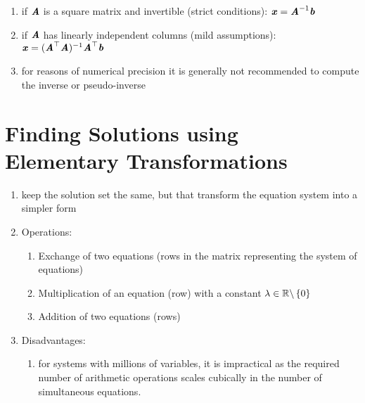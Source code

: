 \begin{enumerate}
    \item if $\text{\textbf{\textit{A}}}$ is a square matrix and invertible (strict conditions): $\text{\textbf{\textit{x}}} = \text{\textbf{\textit{A}}}^{-1}\text{\textbf{\textit{b}}}$
    \hfill \cite{mfml/book/mml/Deisenroth-Faisal-Ong}

    \item if $\text{\textbf{\textit{A}}}$ has linearly independent columns (mild assumptions): $\text{\textbf{\textit{x}}} = (\text{\textbf{\textit{A}}}^\top  \text{\textbf{\textit{A}}})^{-1}\text{\textbf{\textit{A}}}^\top \text{\textbf{\textit{b}}}$
    \hfill \cite{mfml/book/mml/Deisenroth-Faisal-Ong}

    \item for reasons of numerical precision it is generally not recommended to compute the inverse or pseudo-inverse
    \hfill \cite{mfml/book/mml/Deisenroth-Faisal-Ong}
\end{enumerate}


\section{Finding Solutions using Elementary Transformations}

\begin{enumerate}
    \item keep the solution set the same, but that transform the equation system into a simpler form
    \hfill \cite{mfml/book/mml/Deisenroth-Faisal-Ong}

    \item Operations:
    \begin{enumerate}
        \item Exchange of two equations (rows in the matrix representing the system of equations)
        \hfill \cite{mfml/book/mml/Deisenroth-Faisal-Ong}

        \item Multiplication of an equation (row) with a constant $\lambda \in \mathbb{R} \backslash \left\{0\right\}$
        \hfill \cite{mfml/book/mml/Deisenroth-Faisal-Ong}

        \item Addition of two equations (rows) 
        \hfill \cite{mfml/book/mml/Deisenroth-Faisal-Ong}
    \end{enumerate}

    \item Disadvantages:
    \begin{enumerate}
        \item for systems with millions of variables, it is impractical as the required number of arithmetic operations scales cubically in the number of simultaneous equations.
        \hfill \cite{mfml/book/mml/Deisenroth-Faisal-Ong}
    \end{enumerate}
\end{enumerate}



